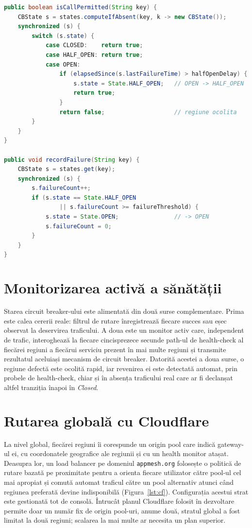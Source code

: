 \documentclass[12pt,a4paper]{report}
\begin{document}
\begin{lstlisting}[language=Java]
public boolean isCallPermitted(String key) {
    CBState s = states.computeIfAbsent(key, k -> new CBState());
    synchronized (s) {
        switch (s.state) {
            case CLOSED:    return true;
            case HALF_OPEN: return true;
            case OPEN:
                if (elapsedSince(s.lastFailureTime) > halfOpenDelay) {
                    s.state = State.HALF_OPEN;   // OPEN -> HALF_OPEN
                    return true;
                }
                return false;                    // regiune ocolita
        }
    }
}

public void recordFailure(String key) {
    CBState s = states.get(key);
    synchronized (s) {
        s.failureCount++;
        if (s.state == State.HALF_OPEN
                || s.failureCount >= failureThreshold) {
            s.state = State.OPEN;                // -> OPEN
            s.failureCount = 0;
        }
    }
}
\end{lstlisting}
\label{lst:cb}

\section{Monitorizarea activă a sănătății}
Starea circuit breaker-ului este alimentată din două surse complementare. Prima este calea cererii reale: filtrul de rutare înregistrează fiecare succes sau eșec observat la deservirea traficului. A doua este un monitor activ care, independent de trafic, interoghează la fiecare cincisprezece secunde path-ul de health-check al fiecărei regiuni a fiecărui serviciu prezent în mai multe regiuni și transmite rezultatul aceluiași mecanism de circuit breaker. Datorită acestei a doua surse, o regiune defectă este ocolită rapid, iar revenirea ei este detectată automat, prin probele de health-check, chiar și în absența traficului real care ar fi declanșat altfel tranziția înapoi în \emph{Closed}.

\section{Rutarea globală cu Cloudflare}
La nivel global, fiecărei regiuni îi corespunde un origin pool care indică gateway-ul ei, cu coordonatele geografice ale regiunii și cu un health monitor atașat. Deasupra lor, un load balancer pe domeniul \texttt{appmesh.org} folosește o politică de rutare bazată pe proximitate pentru a orienta fiecare utilizator către pool-ul cel mai apropiat și comută automat traficul către un pool alternativ atunci când regiunea preferată devine indisponibilă (Figura~\ref{lst:cf}). Configurația acestui strat este gestionată tot de consolă. Întrucât planul Cloudflare folosit în dezvoltare permite doar un număr fix de origin pool-uri, anume două, stratul global a fost limitat la două regiuni; scalarea la mai multe ar necesita un plan superior.
\end{document}
